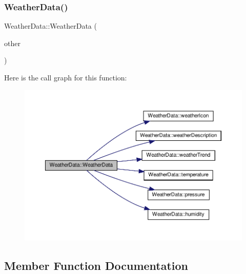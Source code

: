 \mbox{\label{class_weather_data_a48baeaa6b2a77d2a5e008159188416e8}} 
\subsubsection{\texorpdfstring{Weather\+Data()}{WeatherData()}\hspace{0.1cm}{\footnotesize\ttfamily [2/2]}}
{\footnotesize\ttfamily Weather\+Data\+::\+Weather\+Data (\begin{DoxyParamCaption}\item[{const \hyperlink{class_weather_data}{Weather\+Data} \&}]{other }\end{DoxyParamCaption})}

Here is the call graph for this function\+:\nopagebreak
\begin{figure}[H]
\begin{center}
\leavevmode
\includegraphics[width=350pt]{class_weather_data_a48baeaa6b2a77d2a5e008159188416e8_cgraph}
\end{center}
\end{figure}


\subsection{Member Function Documentation}
\mbox{\label{class_weather_data_a23185106cf22ef8c57c96154e37b24d1}} 
